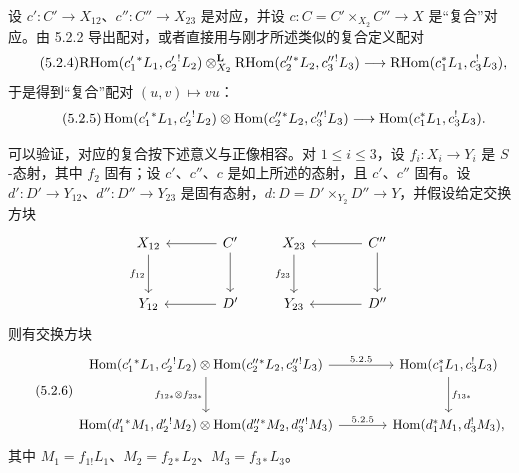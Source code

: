 设 $c':C'\to X_{12}$、$c'':C''\to X_{23}$ 是对应，并设 $c:C=C'\times_{X_2}C''\to X$ 是“复合”对应。由 5.2.2 导出配对，或者直接用与刚才所述类似的复合定义配对
\begin{equation}
\tag{5.2.4}
\mathrm{RHom}(c_1'{}^*L_1,c_2'{}^!L_2)\otimes_{X_2}^{\mathbf L}\mathrm{RHom}(c_2''{}^*L_2,c_3''{}^!L_3)
\longrightarrow\mathrm{RHom}(c_1^*L_1,c_3^!L_3),
\end{equation}
于是得到“复合”配对 $(u,v)\mapsto vu$：
\begin{equation}
\tag{5.2.5}
\operatorname{Hom}(c_1'{}^*L_1,c_2'{}^!L_2)\otimes\operatorname{Hom}(c_2''{}^*L_2,c_3''{}^!L_3)
\longrightarrow\operatorname{Hom}(c_1^*L_1,c_3^!L_3).
\end{equation}

可以验证，对应的复合按下述意义与正像相容。对 $1\leq i\leq 3$，设 $f_i:X_i\to Y_i$ 是 $S$-态射，其中 $f_2$ 固有；设 $c'$、$c''$、$c$ 是如上所述的态射，且 $c'$、$c''$ 固有。设 $d':D'\to Y_{12}$、$d'':D''\to Y_{23}$ 是固有态射，$d:D=D'\times_{Y_2}D''\to Y$，并假设给定交换方块
\[
\begin{tikzcd}[column sep=large,row sep=large]
X_{12} \arrow[d,"f_{12}"'] & C' \arrow[l] \arrow[d] \\
Y_{12} & D' \arrow[l]
\end{tikzcd}
\qquad
\begin{tikzcd}[column sep=large,row sep=large]
X_{23} \arrow[d,"f_{23}"'] & C'' \arrow[l] \arrow[d] \\
Y_{23} & D'' \arrow[l]
\end{tikzcd}
\]
则有交换方块
\begin{equation}
\tag{5.2.6}
\begin{tikzcd}[column sep=large,row sep=large]
\Hom(c_1'{}^*L_1,c_2'{}^!L_2)\otimes\Hom(c_2''{}^*L_2,c_3''{}^!L_3) \arrow[r,"5.2.5"] \arrow[d,"f_{12*}\otimes f_{23*}"']
& \Hom(c_1^*L_1,c_3^!L_3) \arrow[d,"f_{13*}"] \\
\Hom(d_1'{}^*M_1,d_2'{}^!M_2)\otimes\Hom(d_2''{}^*M_2,d_3''{}^!M_3) \arrow[r,"5.2.5"]
& \Hom(d_1^*M_1,d_3^!M_3),
\end{tikzcd}
\end{equation}
其中 $M_1=f_{1!}L_1$、$M_2=f_{2*}L_2$、$M_3=f_{3*}L_3$。

